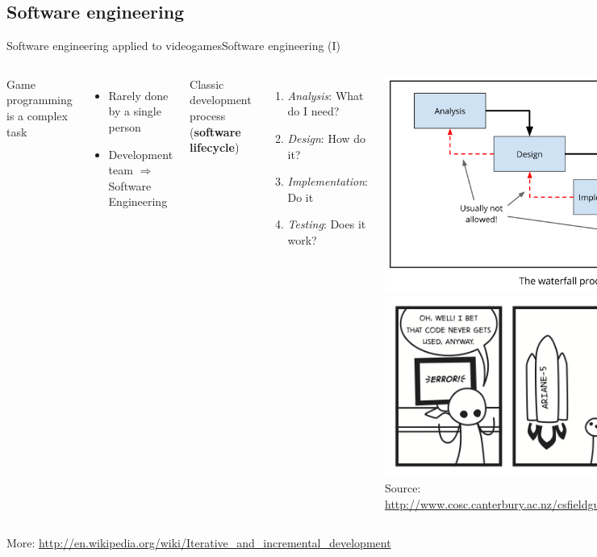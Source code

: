 \documentclass[10pt,compress]{beamer} %
\begin{document}
\subsection[Software engineering]{Software engineering}
\begin{frame}{Software engineering applied to videogames}{Software engineering (I)}
    \begin{columns}
	Game programming is a complex task
	\begin{itemize}
		\item Rarely done by a single person
		\item Development team $\Rightarrow$ \alert{Software Engineering}
  	\end{itemize}
	Classic development process (\textbf{software lifecycle})\\
	\begin{enumerate}
		\item \textit{Analysis}: What do I need?
		\item \textit{Design}: How do it?
		\item \textit{Implementation}: Do it
		\item \textit{Testing}: Does it work?
  	\end{enumerate}
			\centering\includegraphics[width=\linewidth]{figs/process}\\
			\centering\includegraphics[width=\linewidth]{figs/ariane}\\
			\tiny{Source: \url{http://www.cosc.canterbury.ac.nz/csfieldguide/SoftwareEngineering.html}}
	\end{columns}
	\bigskip
	\scriptsize{More: \url{http://en.wikipedia.org/wiki/Iterative\_and\_incremental\_development}}
\end{frame}
\end{document}
